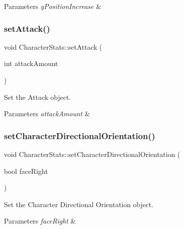 \begin{DoxyParams}{Parameters}
{\em y\+Position\+Increase} & \\
\hline
\end{DoxyParams}
\mbox{\label{classCharacterStats_a67bfa42fdaecd66ad03786a44e45874c}} 
\subsubsection{\texorpdfstring{setAttack()}{setAttack()}}
{\footnotesize\ttfamily void Character\+Stats\+::set\+Attack (\begin{DoxyParamCaption}\item[{int}]{attack\+Amount }\end{DoxyParamCaption})\hspace{0.3cm}{\ttfamily [inline]}}



Set the Attack object. 


\begin{DoxyParams}{Parameters}
{\em attack\+Amount} & \\
\hline
\end{DoxyParams}
\mbox{\label{classCharacterStats_ab5382a7eab127aeb603de23d51877099}} 
\subsubsection{\texorpdfstring{setCharacterDirectionalOrientation()}{setCharacterDirectionalOrientation()}}
{\footnotesize\ttfamily void Character\+Stats\+::set\+Character\+Directional\+Orientation (\begin{DoxyParamCaption}\item[{bool}]{face\+Right }\end{DoxyParamCaption})\hspace{0.3cm}{\ttfamily [inline]}}



Set the Character Directional Orientation object. 


\begin{DoxyParams}{Parameters}
{\em face\+Right} & \\
\hline
\end{DoxyParams}
\mbox{\label{classCharacterStats_ae6624dc6f06e58e635296ad5336cdd70}} 
